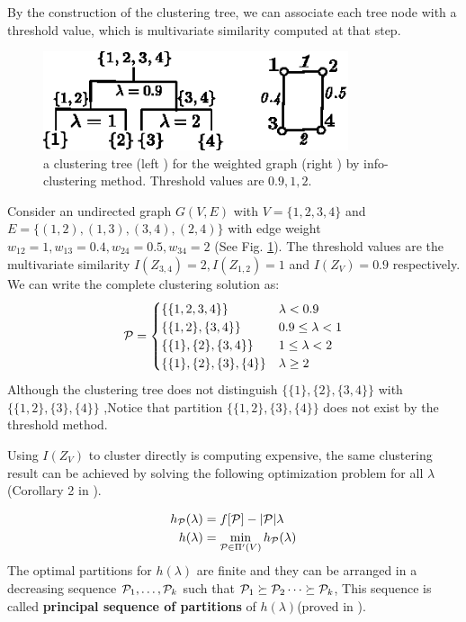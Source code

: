 \documentclass{article}
\begin{document}
By the construction of the clustering tree, we can associate each tree node with a threshold value, which is multivariate similarity computed at that step.
\begin{example}
\begin{figure}
\centering
\includegraphics[width=0.8\textwidth]{pic/threshold.eps}
\caption{a clustering tree (left ) for the weighted graph (right ) by info-clustering method. Threshold values are $0.9, 1, 2$.}\label{fig:threshold}
\end{figure}
Consider an undirected graph $G(V, E)$ with $V=\{1,2,3,4\}$ and $E=\{(1,2),(1,3),(3,4),(2,4)\}$ with edge weight $w_{12}=1,w_{13}=0.4,w_{24}=0.5,w_{34}=2$ (See Fig. \ref{fig:threshold}). The threshold values are the multivariate similarity $I(Z_{3,4})=2, I(Z_{1,2})=1$ and $I(Z_V)=0.9$ respectively. We can write the complete clustering solution as:
\begin{equation*}
\P = 
\begin{cases}
\{\{1,2,3,4\}\} & \lambda < 0.9 \\
\{\{1,2\},\{3,4\}\} & 0.9 \leq \lambda < 1 \\
\{\{1\},\{2\},\{3,4\}\} & 1 \leq \lambda < 2\\
\{\{1\},\{2\},\{3\},\{4\}\} & \lambda \geq 2
\end{cases}
\end{equation*}
Although the clustering tree does not distinguish $\{\{1\},\{2\},\{3,4\}\}$ with $\{\{1,2\},\{3\}, \{4\}\}$ ,Notice that partition $\{\{1,2\},\{3\}, \{4\}\}$ does not exist by the threshold method.
\end{example}
Using $I(Z_V)$ to cluster directly is computing expensive, the same clustering result can be achieved by solving the following optimization problem for all $\lambda$ (Corollary 2 in \cite{RN1}).
\begin{theorem}\label{thm:psp}
\begin{align}\label{eq:hL}
h_{\P}(\lambda) &=  f[\P] - \abs{\P} \lambda  \\
h(\lambda) &= \min_{\P \in \Pi'(V)} h_{\P}(\lambda)
\end{align}
The optimal partitions for $h(\lambda)$ are finite and they can be arranged in a decreasing sequence $\P_1, \dots, \P_k$ such that $\P_1 \succeq \P_2 \dots \succeq \P_k$, This sequence is called \textbf{principal sequence of partitions} of $h(\lambda)$(proved in \cite{RN3}).
\end{theorem}
\end{document}
